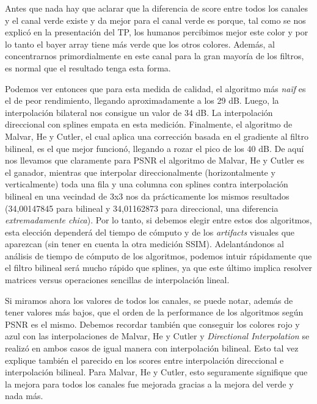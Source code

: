 \begin{itemize}
Antes que nada hay que aclarar que la diferencia de score entre todos los canales y el canal verde existe y da mejor para el canal verde es porque, tal como se nos explicó en la presentación del TP, los humanos percibimos mejor este color y por lo tanto el bayer array tiene más verde que los otros colores. Además, al concentrarnos primordialmente en este canal para la gran mayoría de los filtros, es normal que el resultado tenga esta forma.

Podemos ver entonces que para esta medida de calidad, el algoritmo más \textit{naïf} es el de peor rendimiento, llegando aproximadamente a los 29 dB. Luego, la interpolación bilateral nos consigue un valor de 34 dB. La interpolación direccional con splines empata en esta medición. Finalmente, el algoritmo de Malvar, He y Cutler, el cual aplica una corrección basada en el gradiente al filtro bilineal, es el que mejor funcionó, llegando a rozar el pico de los 40 dB. De aquí nos llevamos que claramente para PSNR el algoritmo de Malvar, He y Cutler es el ganador, mientras que interpolar direccionalmente (horizontalmente y verticalmente) toda una fila y una columna con splines contra interpolación bilineal en una vecindad de 3x3 nos da prácticamente los mismos resultados (34,00147845 para bilineal y 34,01162873 para direccional, una diferencia \textit{extremadamente chica}). Por lo tanto, si debemos elegir entre estos dos algoritmos, esta elección dependerá del tiempo de cómputo y de los \textit{artifacts} visuales que aparezcan (sin tener en cuenta la otra medición SSIM). Adelantándonos al análisis de tiempo de cómputo de los algoritmos, podemos intuir rápidamente que el filtro bilineal será mucho rápido que splines, ya que este último implica resolver matrices versus operaciones sencillas de interpolación lineal.

Si miramos ahora los valores de todos los canales, se puede notar, además de tener valores más bajos, que el orden de la performance de los algoritmos según PSNR es el mismo. Debemos recordar también que conseguir los colores rojo y azul con las interpolaciones de Malvar, He y Cutler y \textit{Directional Interpolation} se realizó en ambos casos de igual manera con interpolación bilineal. Esto tal vez explique también el parecido en los scores entre interpolación direccional e interpolación bilineal. Para Malvar, He y Cutler, esto seguramente signifique que la mejora para todos los canales fue mejorada gracias a la mejora del verde y nada más.

\vspace{\baselineskip}


\end{itemize}

